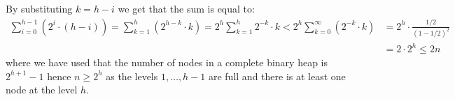 By substituting $k = h - i$ we get that the sum is equal to:
\begin{align*}
    \sum_{i=0}^{h-1} (2^i \cdot (h - i))
    = \sum_{k=1}^{h} (2^{h-k} \cdot k)
    = 2^h \sum_{k=1}^{h} 2^{-k} \cdot k
    < 2^h \sum_{k=0}^{\infty} (2^{-k} \cdot k)
     & = 2^h \cdot \frac{1/2}{(1 - 1/2)^2}
    \\ &= 2 \cdot 2^h
    \leq 2 n
\end{align*}
where we have used that the number of nodes in a complete binary heap is $2^{h + 1} - 1$ hence $n \geq 2^{h}$ as the levels $1, \dots, h - 1$ are full and there is at least one node at the level $h$.